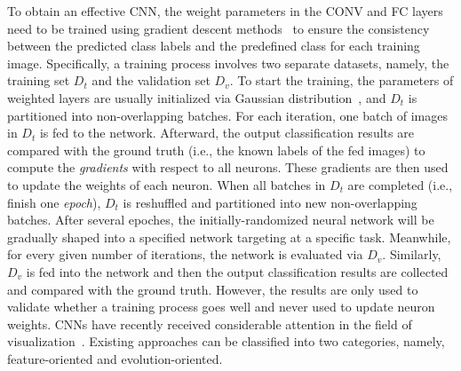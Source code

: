 \documentclass[format=acmsmall, review=false, screen=true]{acmart}
\begin{document}
To obtain an effective CNN, the weight parameters in the CONV and FC layers need to be trained using gradient descent methods~\cite{bottou1991stochastic} to ensure the consistency between the predicted class labels and the predefined class for each training image.
Specifically, a training process involves two separate datasets, namely, the training set $\mathit{D_t}$ and the validation set $\mathit{D_v}$.
To start the training, the parameters of weighted layers are usually initialized via Gaussian distribution~\cite{glorot2010understanding}, and $\mathit{D_t}$ is partitioned into non-overlapping batches.
For each iteration, one batch of images in $\mathit{D_t}$ is fed to the network.
Afterward, the output classification results are compared with the ground truth (i.e., the known labels of the fed images) to compute the \textit{gradients} with respect to all neurons.
These gradients are then used to update the weights of each neuron.
When all batches in $\mathit{D_t}$ are completed (i.e., finish one \textit{epoch}), $D_t$ is reshuffled and partitioned into new non-overlapping batches.
After several epoches, the initially-randomized neural network will be gradually shaped into a specified network targeting at a specific task.
Meanwhile, for every given number of iterations, the network is evaluated via $\mathit{D_v}$.
Similarly, $D_v$ is fed into the network and then the output classification results are collected and compared with the ground truth.
However, the results are only used to validate whether a training process goes well and never used to update neuron weights.
CNNs have recently received considerable attention in the field of visualization~\cite{seifert2017visualizations}.
Existing approaches can be classified into two categories, namely, feature-oriented and evolution-oriented.
\end{document}
